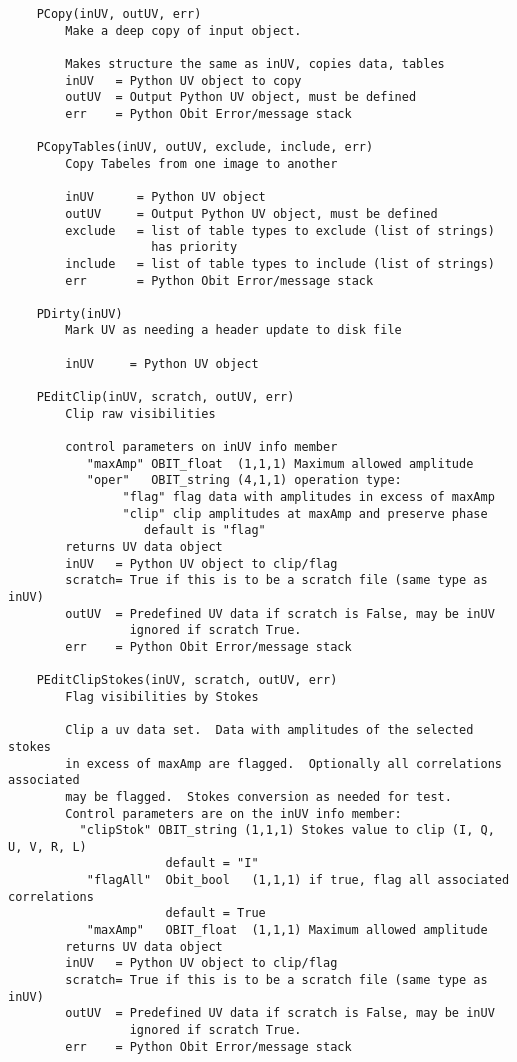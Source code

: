 \documentclass[11pt]{report}
\begin{document}
\begin{verbatim}
    PCopy(inUV, outUV, err)
        Make a deep copy of input object.
        
        Makes structure the same as inUV, copies data, tables
        inUV   = Python UV object to copy
        outUV  = Output Python UV object, must be defined
        err    = Python Obit Error/message stack
    
    PCopyTables(inUV, outUV, exclude, include, err)
        Copy Tabeles from one image to another
        
        inUV      = Python UV object
        outUV     = Output Python UV object, must be defined
        exclude   = list of table types to exclude (list of strings)
                    has priority
        include   = list of table types to include (list of strings)
        err       = Python Obit Error/message stack
    
    PDirty(inUV)
        Mark UV as needing a header update to disk file
        
        inUV     = Python UV object
    
    PEditClip(inUV, scratch, outUV, err)
        Clip raw visibilities
        
        control parameters on inUV info member
           "maxAmp" OBIT_float  (1,1,1) Maximum allowed amplitude
           "oper"   OBIT_string (4,1,1) operation type:
                "flag" flag data with amplitudes in excess of maxAmp
                "clip" clip amplitudes at maxAmp and preserve phase
                   default is "flag"
        returns UV data object
        inUV   = Python UV object to clip/flag
        scratch= True if this is to be a scratch file (same type as inUV)
        outUV  = Predefined UV data if scratch is False, may be inUV
                 ignored if scratch True.
        err    = Python Obit Error/message stack
    
    PEditClipStokes(inUV, scratch, outUV, err)
        Flag visibilities by Stokes
        
        Clip a uv data set.  Data with amplitudes of the selected stokes
        in excess of maxAmp are flagged.  Optionally all correlations associated
        may be flagged.  Stokes conversion as needed for test.
        Control parameters are on the inUV info member:
          "clipStok" OBIT_string (1,1,1) Stokes value to clip (I, Q, U, V, R, L)
                      default = "I"
           "flagAll"  Obit_bool   (1,1,1) if true, flag all associated correlations
                      default = True
           "maxAmp"   OBIT_float  (1,1,1) Maximum allowed amplitude
        returns UV data object
        inUV   = Python UV object to clip/flag
        scratch= True if this is to be a scratch file (same type as inUV)
        outUV  = Predefined UV data if scratch is False, may be inUV
                 ignored if scratch True.
        err    = Python Obit Error/message stack
    

\end{verbatim}
\end{document}
